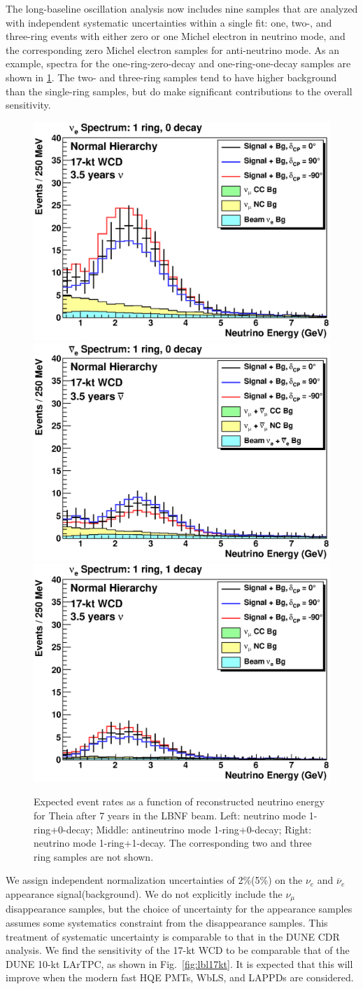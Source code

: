 The long-baseline oscillation analysis now includes nine samples that are analyzed with independent systematic
uncertainties within a single fit: one, two-, and three-ring events with either zero or one Michel electron
in neutrino mode, and the corresponding zero Michel electron samples for anti-neutrino mode. As an example,
spectra for the one-ring-zero-decay and one-ring-one-decay samples are shown in \ref{fig:lblspectra}. The two-
and three-ring samples tend to have higher background than the single-ring samples, but do make significant
contributions to the overall sensitivity.

\begin{figure}[h!]
  \centering
  \includegraphics[width=0.3\linewidth]{lbl/nu_water_skfq_1ring0decay_normal.eps}
  \includegraphics[width=0.3\linewidth]{lbl/anu_water_skfq_1ring0decay_normal.eps}
  \includegraphics[width=0.3\linewidth]{lbl/nu_water_skfq_1ring1decay_normal.eps}
  \caption{Expected event rates as a function of reconstructed neutrino energy for Theia after 7 years in the LBNF beam. Left: neutrino mode 1-ring+0-decay; Middle: antineutrino mode 1-ring+0-decay; Right: neutrino mode 1-ring+1-decay. The corresponding two and three ring samples are not shown.}
  \label{fig:lblspectra}
\end{figure}

We assign independent normalization uncertainties of 2\%(5\%) on the $\nu_{e}$ and $\overline{\nu}_{e}$ appearance
signal(background). We do not explicitly include the $\nu_{\mu}$ disappearance samples, but the choice of
uncertainty for the appearance samples assumes some systematics constraint from the disappearance samples.
This treatment of systematic uncertainty is comparable to that in the DUNE CDR analysis. We find the sensitivity
of the 17-kt WCD to be comparable that of the DUNE 10-kt LArTPC, as shown in Fig.~\ref{fig:lbl17kt}.
It is expected that this will improve when the modern fast HQE PMTs, WbLS, and LAPPDs are considered. 

